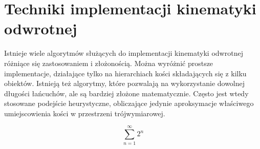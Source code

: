 \documentclass[a4paper, 12pt]{article} \linespread{1.3}
\begin{document}
\section{Techniki implementacji kinematyki odwrotnej} Istnieje wiele algorytmów
służących do implementacji kinematyki odwrotnej różniące się zastosowaniem i
złożonością. Można wyróżnić prostsze implementacje, działające tylko na
hierarchiach kości składających się z kilku obiektów. Istnieją też algorytmy,
które pozwalają na wykorzystanie dowolnej długości łańcuchów, ale są bardziej
złożone matematycznie. Często jest wtedy stosowane podejście heurystyczne,
obliczające jedynie aproksymacje właściwego umiejscowienia kości w przestrzeni
trójwymiarowej. 

\[
	\sum_{n=1}^{\infty}2^n
\]
\end{document}
